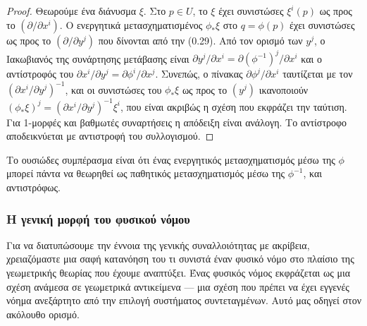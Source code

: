 \documentclass[11pt,a4paper,twoside,openright]{book}
\begin{document}
\begin{proof}
Θεωρούμε ένα διάνυσμα $\xi$. Στο $p \in U$, το $\xi$ έχει συνιστώσες $\xi^i(p)$ ως προς το $(\partial / \partial x^i)$. Ο ενεργητικά μετασχηματισμένος $\phi_* \xi$ στο $q = \phi(p)$ έχει συνιστώσες ως προς το $(\partial / \partial y^j)$ που δίνονται από την (0.29). Από τον ορισμό των $y^j$, ο Ιακωβιανός της συνάρτησης μετάβασης είναι $\partial y^j / \partial x^i = \partial (\phi^{-1})^j / \partial x^i$ και ο αντίστροφός του $\partial x^i / \partial y^j = \partial \phi^i / \partial x^j$. Συνεπώς, ο πίνακας $\partial \phi^j / \partial x^i$ ταυτίζεται με τον $(\partial x^i / \partial y^j)^{-1}$, και οι συνιστώσες του $\phi_* \xi$ ως προς το $(y^j)$ ικανοποιούν $(\phi_* \xi)^j = (\partial x^i / \partial y^j)^{-1} \xi^i$, που είναι ακριβώς η σχέση που εκφράζει την ταύτιση. Για 1-μορφές και βαθμωτές συναρτήσεις η απόδειξη είναι ανάλογη. Το αντίστροφο αποδεικνύεται με αντιστροφή του συλλογισμού.
\end{proof}

Το ουσιώδες συμπέρασμα είναι ότι ένας ενεργητικός μετασχηματισμός μέσω της $\phi$ μπορεί πάντα να θεωρηθεί ως παθητικός μετασχηματισμός μέσω της $\phi^{-1}$, και αντιστρόφως.

\subsubsection{Η γενική μορφή του φυσικού νόμου}

Για να διατυπώσουμε την έννοια της γενικής συναλλοιότητας με ακρίβεια, χρειαζόμαστε μια σαφή κατανόηση του τι συνιστά έναν φυσικό νόμο στο πλαίσιο της γεωμετρικής θεωρίας που έχουμε αναπτύξει. Ένας φυσικός νόμος εκφράζεται ως μια σχέση ανάμεσα σε γεωμετρικά αντικείμενα — μια σχέση που πρέπει να έχει εγγενές νόημα ανεξάρτητο από την επιλογή συστήματος συντεταγμένων. Αυτό μας οδηγεί στον ακόλουθο ορισμό.
\end{document}
